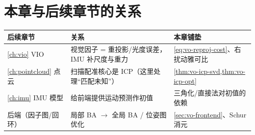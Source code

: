 \section*{本章与后续章节的关系}
\begin{table}[H]\centering\small
\begin{tabular}{lll}
\toprule
后续章节 & 关系 & 本章铺垫 \\
\midrule
\cref{ch:vio} VIO & 视觉因子 = 重投影/光度误差，IMU 补尺度与重力 & \cref{eq:vo-reproj-cost}、右扰动雅可比 \\
\cref{ch:pointcloud} 点云 & 扫描配准核心是 ICP（这里处理“匹配未知”） & \cref{thm:vo-icp-svd,thm:vo-icp-opt} \\
\cref{ch:imu} IMU 模型 & 给前端提供运动预测作初值 & 三角化/直接法对初值的依赖 \\
后端（因子图/回环） & 局部 BA $\to$ 全局 BA / 位姿图优化 & \cref{sec:vo-frontend}、Schur 消元 \\
\bottomrule
\end{tabular}
\end{table}

